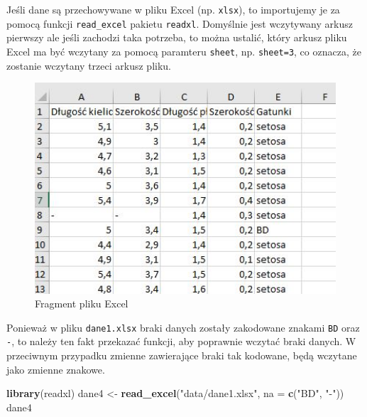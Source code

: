 \documentclass[
]{book}
\newenvironment{Shaded}{\begin{snugshade}}{\end{snugshade}}
\newcommand{\AttributeTok}[1]{\textcolor[rgb]{0.13,0.29,0.53}{#1}}
\newcommand{\FunctionTok}[1]{\textcolor[rgb]{0.13,0.29,0.53}{\textbf{#1}}}
\newcommand{\NormalTok}[1]{#1}
\newcommand{\OtherTok}[1]{\textcolor[rgb]{0.56,0.35,0.01}{#1}}
\newcommand{\StringTok}[1]{\textcolor[rgb]{0.31,0.60,0.02}{#1}}
\theoremstyle{plain}
\theoremstyle{definition}
\theoremstyle{definition}
\theoremstyle{definition}
\theoremstyle{definition}
\theoremstyle{definition}
\theoremstyle{remark}
\begin{document}
Jeśli dane są przechowywane w pliku Excel (np. \texttt{xlsx}), to importujemy je za pomocą funkcji \texttt{read\_excel} pakietu \texttt{readxl}. Domyślnie jest wczytywany arkusz pierwszy ale jeśli zachodzi taka potrzeba, to można ustalić, który arkusz pliku Excel ma być wczytany za pomocą paramteru \texttt{sheet}, np. \texttt{sheet=3}, co oznacza, że zostanie wczytany trzeci arkusz pliku.

\begin{figure}
\includegraphics[width=5.84in]{images/excel} \caption{Fragment pliku Excel}\label{fig:excel}
\end{figure}

Ponieważ w pliku \texttt{dane1.xlsx} braki danych zostały zakodowane znakami \texttt{BD} oraz \texttt{-}, to należy ten fakt przekazać funkcji, aby poprawnie wczytać braki danych. W przeciwnym przypadku zmienne zawierające braki tak kodowane, będą wczytane jako zmienne znakowe.

\begin{Shaded}
\begin{Highlighting}[]
\FunctionTok{library}\NormalTok{(readxl)}
\NormalTok{dane4 }\OtherTok{\textless{}{-}} \FunctionTok{read\_excel}\NormalTok{(}\StringTok{"data/dane1.xlsx"}\NormalTok{, }\AttributeTok{na =} \FunctionTok{c}\NormalTok{(}\StringTok{"BD"}\NormalTok{, }\StringTok{"{-}"}\NormalTok{))}
\NormalTok{dane4}
\end{Highlighting}
\end{Shaded}
\end{document}
